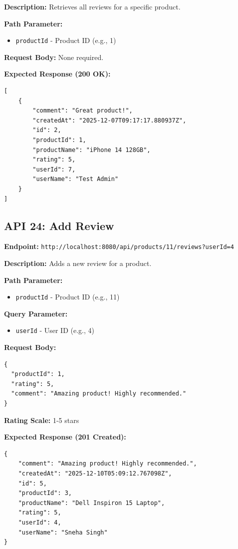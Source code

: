 \documentclass[12pt, a4paper]{article}
\begin{document}
\textbf{Description:} Retrieves all reviews for a specific product.

\textbf{Path Parameter:}
\begin{itemize}
    \item \texttt{productId} - Product ID (e.g., 1)
\end{itemize}

\textbf{Request Body:} None required.

\textbf{Expected Response (200 OK):}
\begin{lstlisting}
[
    {
        "comment": "Great product!",
        "createdAt": "2025-12-07T09:17:17.880937Z",
        "id": 2,
        "productId": 1,
        "productName": "iPhone 14 128GB",
        "rating": 5,
        "userId": 7,
        "userName": "Test Admin"
    }
]
\end{lstlisting}

\vspace{0.5cm}

\subsection{API 24: Add Review}

\begin{tcolorbox}[colback=postcolor!10, colframe=postcolor, title=POST]
\textbf{Endpoint:} \texttt{http://localhost:8080/api/products/11/reviews?userId=4}
\end{tcolorbox}

\textbf{Description:} Adds a new review for a product.

\textbf{Path Parameter:}
\begin{itemize}
    \item \texttt{productId} - Product ID (e.g., 11)
\end{itemize}

\textbf{Query Parameter:}
\begin{itemize}
    \item \texttt{userId} - User ID (e.g., 4)
\end{itemize}

\textbf{Request Body:}
\begin{lstlisting}
{
  "productId": 1,
  "rating": 5,
  "comment": "Amazing product! Highly recommended."
}
\end{lstlisting}

\textbf{Rating Scale:} 1-5 stars

\textbf{Expected Response (201 Created):}
\begin{lstlisting}
{
    "comment": "Amazing product! Highly recommended.",
    "createdAt": "2025-12-10T05:09:12.767098Z",
    "id": 5,
    "productId": 3,
    "productName": "Dell Inspiron 15 Laptop",
    "rating": 5,
    "userId": 4,
    "userName": "Sneha Singh"
}
\end{lstlisting}
\end{document}
